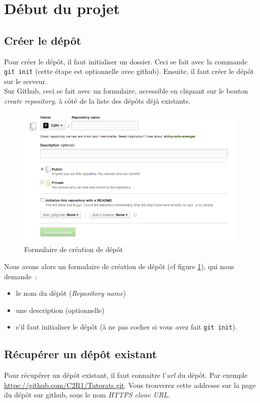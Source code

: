\documentclass[a4paper,10pt]{report}
\begin{document}
  \section{D\'ebut du projet}
    \subsection{Cr\'eer le d\'ep\^ot}
Pour cr\'eer le d\'ep\^ot, il faut initialiser un dossier. Ceci se fait avec la commande \verb|git init| (cette \'etape est optionnelle avec github). Ensuite, il faut cr\'eer le d\'ep\^ot sur le serveur.\\
Sur Github, ceci se fait avec un formulaire, accessible en cliquant sur le bouton \emph{create repository}, \`a c\^ot\'e de la liste des d\'ep\^ots d\'ej\`a existants.\\
\begin{figure}[h!]
  \begin{center}
    \includegraphics[scale=0.3]{images/createRepoForm}
    \caption{Formulaire de cr\'eation de d\'ep\^ot}
    \label{creationRepo}
  \end{center}
\end{figure}

Nous avons alors un formulaire de cr\'eation de d\'ep\^ot (cf figure \ref{creationRepo}), qui nous demande~:
\begin{itemize}
 \item le nom du d\'ep\^ot (\emph{Repository name})
 \item une description (optionnelle)
 \item s'il faut initialiser le d\'ep\^ot (\`a ne pas cocher si vous avez fait \verb|git init|).
\end{itemize}

    \subsection{R\'ecup\'erer un d\'ep\^ot existant}
Pour r\'ecup\'erer un d\'ep\^ot existant, il faut connaitre l'\emph{url} du d\'ep\^ot. Par exemple \url{https://github.com/C2R1/Tutorats.git}. Vous trouverez cette addresse sur la page du d\'ep\^ot sur github, sous le nom \emph{HTTPS clone URL}.\\
\end{document}
